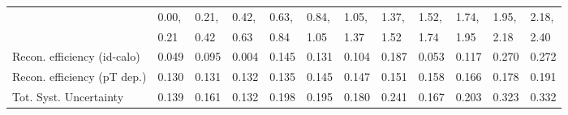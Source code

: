 \begin{tabular}{l|p{0.6cm}p{0.6cm}p{0.6cm}p{0.6cm}p{0.6cm}p{0.6cm}p{0.6cm}p{0.6cm}p{0.6cm}p{0.6cm}p{0.6cm}}
\hline
   & 0.00, & 0.21, & 0.42, & 0.63, & 0.84, & 1.05, & 1.37, & 1.52, & 1.74, & 1.95, & 2.18,  \\ 
   & 0.21 & 0.42 & 0.63 & 0.84 & 1.05 & 1.37 & 1.52 & 1.74 & 1.95 & 2.18 & 2.40  \\ 
\hline
Recon. efficiency (id-calo)              & 0.049 & 0.095 & 0.004 & 0.145 & 0.131 & 0.104 & 0.187 & 0.053 & 0.117 & 0.270 & 0.272 \\
\hline
Recon. efficiency (pT dep.)              & 0.130 & 0.131 & 0.132 & 0.135 & 0.145 & 0.147 & 0.151 & 0.158 & 0.166 & 0.178 & 0.191 \\
\hline
Tot. Syst. Uncertainty                   & 0.139 & 0.161 & 0.132 & 0.198 & 0.195 & 0.180 & 0.241 & 0.167 & 0.203 & 0.323 & 0.332 \\
\hline
\end{tabular}

